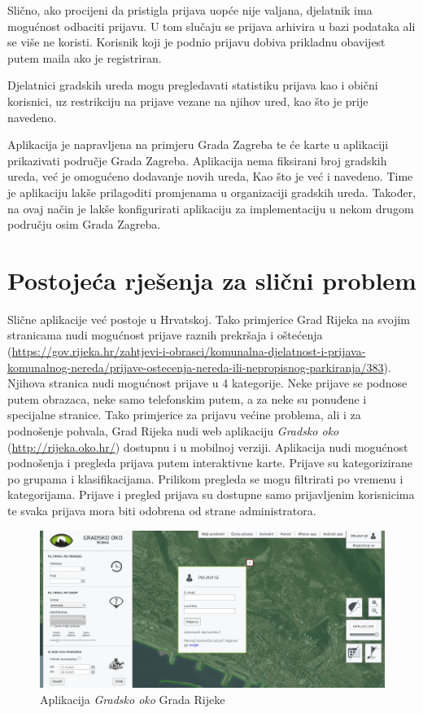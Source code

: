 		Slično, ako procijeni da pristigla prijava uopće nije valjana, djelatnik ima mogućnost odbaciti prijavu. U tom slučaju se prijava arhivira u bazi podataka ali se više ne koristi. Korisnik koji je podnio prijavu dobiva prikladnu obavijest putem maila ako je registriran.
		
		Djelatnici gradskih ureda mogu pregledavati statistiku prijava kao i obični korisnici, uz restrikciju na prijave vezane na njihov ured, kao što je prije navedeno.
		
		Aplikacija je napravljena na primjeru Grada Zagreba te će karte u aplikaciji prikazivati područje Grada Zagreba. Aplikacija nema fiksirani broj gradskih ureda, već je omogućeno dodavanje novih ureda, Kao što je već i navedeno. Time je aplikaciju lakše prilagoditi promjenama u organizaciji gradskih ureda. Također, na ovaj način je lakše konfigurirati aplikaciju za implementaciju u nekom drugom području osim Grada Zagreba.
		\eject
		
		\section{Postojeća rješenja za slični problem}
		
			Slične aplikacije već postoje u Hrvatskoj. Tako primjerice Grad Rijeka na svojim stranicama nudi mogućnost prijave raznih prekršaja i oštećenja (\url{https://gov.rijeka.hr/zahtjevi-i-obrasci/komunalna-djelatnost-i-prijava-komunalnog-nereda/prijave-ostecenja-nereda-ili-nepropisnog-parkiranja/383}). Njihova stranica nudi mogućnost prijave u 4 kategorije. Neke prijave se podnose putem obrazaca, neke samo telefonskim putem, a za neke su ponuđene i specijalne stranice. Tako primjerice za prijavu većine problema, ali i za podnošenje pohvala, Grad Rijeka nudi web aplikaciju \textit{Gradsko oko} (\url{http://rijeka.oko.hr/}) dostupnu i u mobilnoj verziji. Aplikacija nudi mogućnost podnošenja i pregleda prijava putem interaktivne karte. Prijave su kategorizirane po grupama i klasifikacijama. Prilikom pregleda se mogu filtrirati po vremenu i kategorijama. Prijave i pregled prijava su dostupne samo prijavljenim korisnicima te svaka prijava mora biti odobrena od strane administratora.
		
		\begin{figure}[H]
			\includegraphics[width=\textwidth]{slike/GradskoOko.PNG}
			\caption{Aplikacija \textit{Gradsko oko} Grada Rijeke}
			\label{fig:gradskooko} %
		\end{figure}
		
